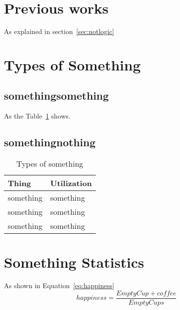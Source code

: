 \documentclass[12pt,twoside]{report}
\begin{document}
	\section{Previous works}
	\label{sec:prevworks}
	{
	As explained in section~\ref{sec:notlogic}
	}
	
	\section{Types of Something}
	\label{sec:typesome}
	{
	}
		
		\subsection{somethingsomething}
		\label{subsec:somesome}
		{
		As the Table~\ref{tb:typesomething} shows.
		}
		\subsection{somethingnothing}
		\label{subsec:somenoth}
		{
        \begin{table}[]
            \centering
            \begin{tabular}{ll}
            \hline
            \textbf{Thing} & \textbf{Utilization} \\
            \hline
                something & something \\
                something & something \\
                something & something \\
                \hline
            \end{tabular}
            \caption{Types of something}
            \label{tb:typesomething}
        \end{table}
		}
	\section{Something Statistics}
	\label{sec:somestatistics}
	{
		As shown in Equation~\ref{eq:happiness}
		\begin{equation}\label{eq:happiness}
			happiness=\frac{EmptyCup+coffee}{EmptyCups}
		\end{equation}	
	}
	
\end{document}
